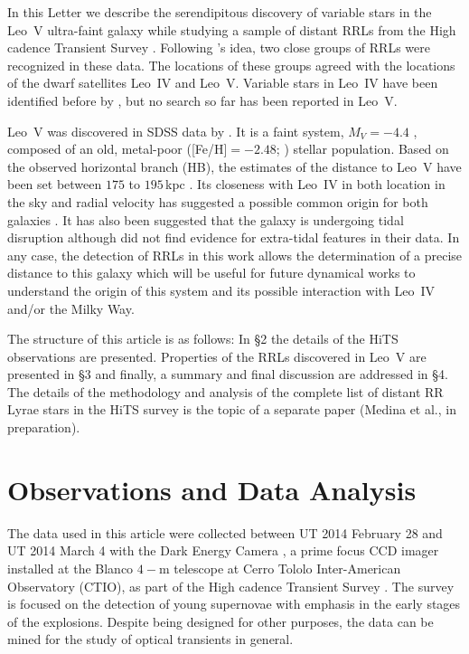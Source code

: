 \documentclass[iop]{emulateapj}
\begin{document}
In this Letter we describe the serendipitous discovery of variable stars in the Leo~V ultra-faint galaxy while studying a sample of distant RRLs from the High cadence Transient Survey \citep[HiTS;][]{forster16a}.
Following \citeauthor{Baker2015}'s idea, two close groups of RRLs were recognized in these data. 
The locations of these groups agreed with the locations of the dwarf satellites Leo~IV and Leo~V. 
Variable stars in Leo~IV have been identified before by \citet{Moretti2009}, but no search so far has been reported in Leo~V.

Leo~V was discovered in SDSS data by \citet{belokurov08a}. 
It is a faint system, $M_V=-4.4$ \citep{Sand2012}, composed of an old, metal-poor ([Fe/H]$=-2.48$; \citealt{Collins2016}) stellar population. 
Based on the observed horizontal branch (HB), the estimates of the distance to Leo~V have been set between $175$ to $195$\,kpc \citep{belokurov08a,deJong2010,Sand2012}.
Its closeness with Leo~IV in both location in the sky and radial velocity has suggested a possible common origin for both galaxies \citep{belokurov08a,deJong2010,Blana2012}. 
It has also been suggested that the galaxy is undergoing tidal disruption \citep{belokurov08a,deJong2010,Collins2016} although \citet{Sand2012} did not find evidence for extra-tidal features in their data. 
In any case, the detection of RRLs in this work allows the determination of a precise distance to this galaxy which will be useful for future dynamical works to understand the origin of this system and its possible interaction with Leo~IV and/or the Milky Way.

The structure of this article is as follows: In \S2 the details of the HiTS observations are presented.
Properties of the RRLs discovered in Leo~V are presented in  \S3 and finally, a summary and final discussion are addressed in  \S4.
The details of the methodology and analysis of the complete list of distant RR Lyrae stars in the HiTS survey is the topic of a separate paper (Medina et al., in preparation).


\section{Observations and Data Analysis}

The data used in this article were collected between UT 2014 February 28 and UT 2014 March 4 with the Dark Energy Camera \citep[DECam,][]{Flaugher2015}, a prime focus CCD imager installed at the Blanco $4-$m telescope at Cerro Tololo Inter-American Observatory (CTIO), as part of the High cadence Transient Survey \citep[HiTS,][hereinafter \citeauthor*{forster16a}]{forster16a}. 
The survey is focused on the detection of young supernovae with emphasis in the early stages of the explosions. 
Despite being designed for other purposes, the data can be mined for the study of optical transients in general. 
\end{document}
